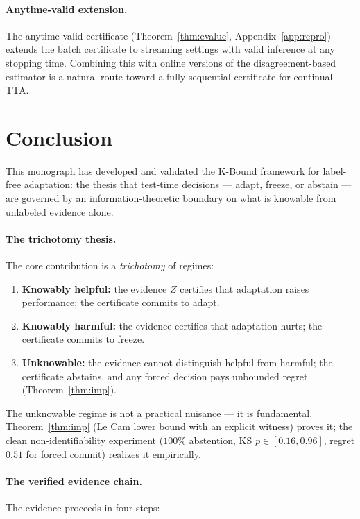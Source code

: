 \paragraph{Anytime-valid extension.}
The anytime-valid certificate (Theorem~\ref{thm:evalue}, Appendix~\ref{app:repro})
extends the batch certificate to streaming settings with valid inference at any
stopping time.  Combining this with online versions of the disagreement-based
estimator is a natural route toward a fully sequential certificate for continual TTA.

\section{Conclusion}\label{sec:disc-conclusion}

This monograph has developed and validated the K-Bound framework for label-free
adaptation: the thesis that test-time decisions --- adapt, freeze, or abstain ---
are governed by an information-theoretic boundary on what is knowable from
unlabeled evidence alone.

\paragraph{The trichotomy thesis.}
The core contribution is a \emph{trichotomy} of regimes:
\begin{enumerate}
\item \textbf{Knowably helpful:} the evidence $Z$ certifies that adaptation raises
  performance; the certificate commits to adapt.
\item \textbf{Knowably harmful:} the evidence certifies that adaptation hurts; the
  certificate commits to freeze.
\item \textbf{Unknowable:} the evidence cannot distinguish helpful from harmful;
  the certificate abstains, and any forced decision pays unbounded regret
  (Theorem~\ref{thm:imp}).
\end{enumerate}
The unknowable regime is not a practical nuisance --- it is fundamental.
Theorem~\ref{thm:imp} (Le Cam lower bound with an explicit witness) proves it;
the clean non-identifiability experiment ($100\%$ abstention, KS $p \in [0.16,
0.96]$, regret $0.51$ for forced commit) realizes it empirically.

\paragraph{The verified evidence chain.}
The evidence proceeds in four steps:

